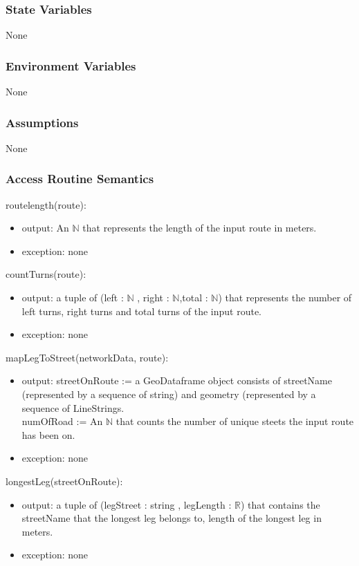 \documentclass[12pt, titlepage]{article}
\begin{document}
\subsubsection{State Variables}

None
\subsubsection{Environment Variables}

None

\subsubsection{Assumptions}

None

\subsubsection{Access Routine Semantics}

\noindent routelength(route):
\begin{itemize}
\item output: An $\mathbb{N}$ that represents the length of the input route in meters.
\item exception: none
\end{itemize}

\noindent countTurns(route):
\begin{itemize}
\item output: a tuple of (left : $\mathbb{N}$ , right : $\mathbb{N}$,total : $\mathbb{N}$) that represents the number of left turns, right turns and total turns of the input route.
\item exception: none
\end{itemize}

\noindent mapLegToStreet(networkData, route):
\begin{itemize}
\item output: streetOnRoute := a GeoDataframe object consists of streetName (represented by a sequence of string) and geometry (represented by a sequence of LineStrings.\\
numOfRoad := An $\mathbb{N}$ that counts the number of unique steets the input route has been on.
\item exception: none
\end{itemize}

\noindent longestLeg(streetOnRoute):
\begin{itemize}
\item output:  a tuple of (legStreet : string , legLength : $\mathbb{R}$) that contains the streetName that the longest leg belongs to, length of the longest leg in meters.
\item exception: none
\end{itemize}
\end{document}
